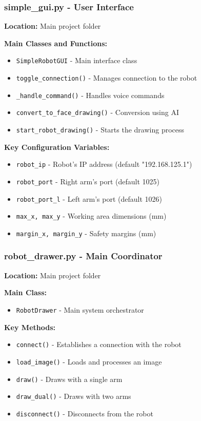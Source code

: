 \documentclass[a4paper,12pt]{article}
\begin{document}
\subsubsection{simple\_gui.py - User Interface}
\textbf{Location:} Main project folder

\textbf{Main Classes and Functions:}
\begin{itemize}
\item \texttt{SimpleRobotGUI} - Main interface class
\item \texttt{toggle\_connection()} - Manages connection to the robot
\item \texttt{\_handle\_command()} - Handles voice commands
\item \texttt{convert\_to\_face\_drawing()} - Conversion using AI
\item \texttt{start\_robot\_drawing()} - Starts the drawing process
\end{itemize}

\textbf{Key Configuration Variables:}
\begin{itemize}
\item \texttt{robot\_ip} - Robot's IP address (default "192.168.125.1")
\item \texttt{robot\_port} - Right arm's port (default 1025)
\item \texttt{robot\_port\_l} - Left arm's port (default 1026)
\item \texttt{max\_x, max\_y} - Working area dimensions (mm)
\item \texttt{margin\_x, margin\_y} - Safety margins (mm)
\end{itemize}

\subsubsection{robot\_drawer.py - Main Coordinator}
\textbf{Location:} Main project folder

\textbf{Main Class:}
\begin{itemize}
\item \texttt{RobotDrawer} - Main system orchestrator
\end{itemize}

\textbf{Key Methods:}
\begin{itemize}
\item \texttt{connect()} - Establishes a connection with the robot
\item \texttt{load\_image()} - Loads and processes an image
\item \texttt{draw()} - Draws with a single arm
\item \texttt{draw\_dual()} - Draws with two arms
\item \texttt{disconnect()} - Disconnects from the robot
\end{itemize}
\end{document}
